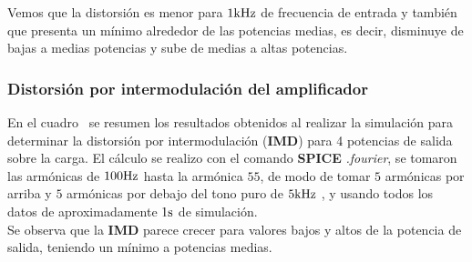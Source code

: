 
Vemos que la distorsión es menor para $1 \si[per-mode=symbol]{\kilo\hertz}$  de frecuencia de entrada y también que presenta un mínimo alrededor de las potencias medias, es decir, disminuye de bajas a medias potencias y sube de medias a altas potencias.


\clearpage

\subsubsection{Distorsión por intermodulación del amplificador}

En el cuadro~ se resumen los resultados obtenidos al realizar la simulación para determinar la distorsión por intermodulación (\textbf{IMD}) para 4 potencias de salida sobre la carga. El cálculo se realizo con el comando \textbf{SPICE} \textit{.fourier}, se tomaron las armónicas de $100 \si[per-mode=symbol]{\hertz}$ hasta la armónica $55$, de modo de tomar $5$ armónicas por arriba y $5$ armónicas por debajo del tono puro de $5 \si[per-mode=symbol]{\kilo\hertz}$ , y usando todos los datos de aproximadamente $1\si[per-mode=symbol]{\second}$ de simulación.\\
Se observa que la \textbf{IMD} parece crecer para valores bajos y altos de la potencia de salida, teniendo un mínimo a potencias medias.



 
\begin{table}[H]  %
    
    \setlength\arrayrulewidth{1.5pt}
    \def\clinecolor{\hhline{|>{\arrayrulecolor{white}}-%
    >{\arrayrulecolor{white}}|-|-|-|-|}}
	\caption{\footnotesize{Distorsión armónica total (\textbf{IMD}).}}
	\label{table:table_IMD}
\end{table}

